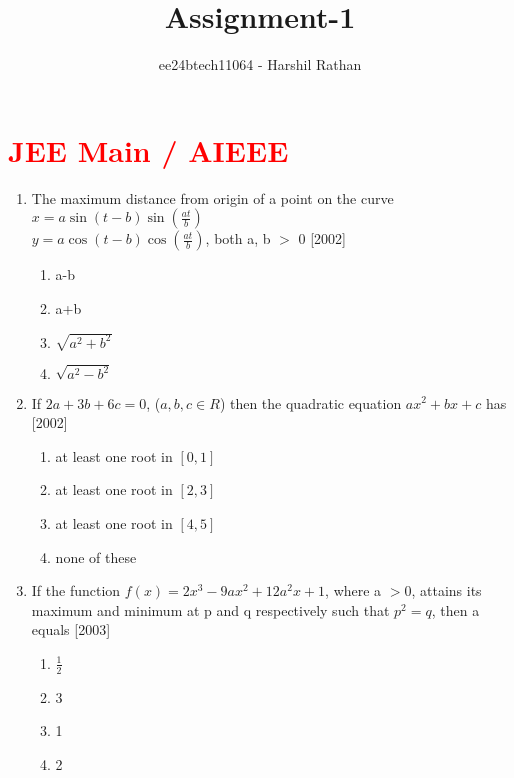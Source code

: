 \documentclass[journal,12pt,twocolumn]{IEEEtran}
\theoremstyle{remark}
\begin{document}

\vspace{3cm}

\title{Assignment-1}
\author{ee24btech11064 - Harshil Rathan}
\maketitle
\newpage
\bigskip

\renewcommand{\thefigure}{\theenumi}
\renewcommand{\thetable}{\theenumi}
\section{\textcolor{red}{JEE Main / AIEEE}}
\begin{enumerate}
\item The maximum distance from origin of a point on the curve\\ $x = a \sin(t-b) \sin(\frac{at}{b})$\\ $y = a \cos(t-b) \cos(\frac{at}{b})$, both a, b $>$ 0 \hfill{[2002]}
\begin{enumerate}
    \item a-b
        \item a+b
	    \item $\sqrt{a^2+b^2}$
	        \item $\sqrt{a^2-b^2}$  \\
		\end{enumerate}
		\item If $2a+3b+6c=0$, ($a,b,c \in R$) then the quadratic equation $ax^2+bx+c$ has \hfill{[2002]}
		\begin{enumerate}
		    \item at least one root in $[0,1]$
		        \item at  least one root in $[2,3]$
			    \item at least one root in $[4,5]$
			        \item none of these \\
				\end{enumerate}
				\item If the function $f(x)=2x^3-9ax^2+12a^2x+1$, where a $>$0, attains its maximum and minimum at p and q respectively such that $p
				    ^2=q$, then a equals  \hfill{[2003]}
				    \begin{enumerate}
				           \item $\frac{1}{2}$
					          \item 3
						         \item 1
							        \item 2

\end{enumerate}
\end{enumerate}
\end{document}

